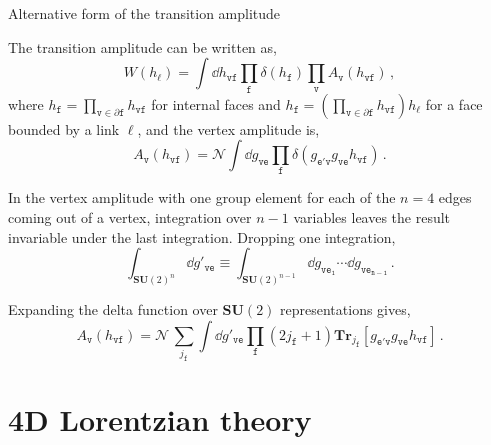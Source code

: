 \documentclass[12pt,titlepage]{article}
\begin{document}
\begin{frame}{Alternative form of the transition amplitude}
    \begin{list}{\,}{\leftmargin=1em \itemindent=0em}
        \item<1-> The transition amplitude can be written as,\vspace{-4pt}
        \begin{equation}
            W(h_\ell)=\int\dd{h_\mathtt{vf}}\prod_\mathtt{f}\delta(h_\mathtt{f})\prod_\mathtt{v}A_\mathtt{v}(h_\mathtt{vf})\,,
        \end{equation}
        where $h_\mathtt{f}=\prod\limits_{\mathtt{v}\in\partial\mathtt{f}}h_\mathtt{vf}$ for internal faces and $h_\mathtt{f}=\left(\prod\limits_{\mathtt{v}\in\partial\mathtt{f}}h_\mathtt{vf}\right)h_\ell$ for a face bounded by a link $\ell$, and the vertex amplitude is,\vspace{-4pt}
        \begin{equation}
            A_\mathtt{v}(h_\mathtt{vf})=\mathcal{N}\int\dd{g_\mathtt{ve}}\prod_\mathtt{f}\delta(g_\mathtt{e'v}g_\mathtt{ve}h_\mathtt{vf})\,.
        \end{equation}
        \item<2-> In the vertex amplitude with one group element for each of the $n=4$ edges coming out of a vertex, integration over $n-1$ variables leaves the result invariable under the last integration. Dropping one integration,\vspace{-3pt}
        \begin{equation}
            \int_{{\mathbf{SU}(2)}^n}\dd{g'_{\mathtt{ve}}}\equiv\int_{{\mathbf{SU}(2)}^{n-1}}\dd{g_{\mathtt{ve_1}}}\cdots\dd{g_{\mathtt{ve_{n-1}}}}\,.
        \end{equation}
        \item<3-> Expanding the delta function over $\mathbf{SU}(2)$ representations gives,\vspace{-4pt}
        \begin{equation}
            A_\mathtt{v}(h_\mathtt{vf})=\mathcal{N}\,\sum_{j_\mathtt{f}}\int\dd{g'_\mathtt{ve}}\prod_\mathtt{f}(2j_\mathtt{f}+1)\mathbf{Tr}_{j_\mathtt{f}}[g_\mathtt{e'v}g_\mathtt{ve}h_\mathtt{vf}]\,.
        \end{equation}
    \end{list}
\end{frame}

\section{4D Lorentzian theory}
\end{document}
